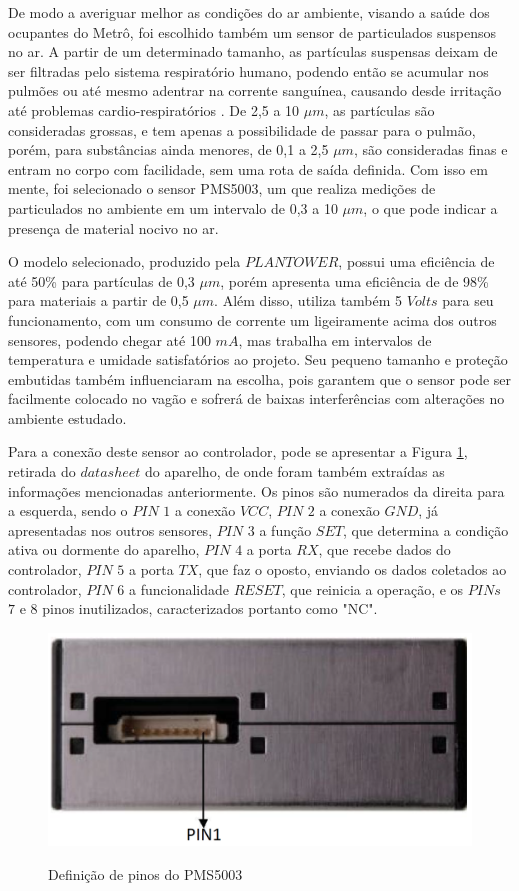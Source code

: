 \documentclass[acronym,symbols]{fei}
\begin{document}
De modo a averiguar melhor as condições do ar ambiente, visando a saúde dos ocupantes do Metrô, foi escolhido também um sensor de particulados suspensos no ar. A partir de um determinado tamanho, as partículas suspensas deixam de ser filtradas pelo sistema respiratório humano, podendo então se acumular nos pulmões ou até mesmo adentrar na corrente sanguínea, causando desde irritação até problemas cardio-respiratórios \cite{pm25}. De 2,5 a 10 $\mu$$m$, as partículas são consideradas grossas, e tem apenas a possibilidade de passar para o pulmão, porém, para substâncias ainda menores, de 0,1 a 2,5 $\mu$$m$, são consideradas finas e entram no corpo com facilidade, sem uma rota de saída definida. Com isso em mente, foi selecionado o sensor PMS5003, um que realiza medições de particulados no ambiente em um intervalo de 0,3 a 10 $\mu$$m$, o que pode indicar a presença de material nocivo no ar.

O modelo selecionado, produzido pela $PLANTOWER$, possui uma eficiência de até 50\% para partículas de 0,3 $\mu$$m$, porém apresenta uma eficiência de de 98\% para materiais a partir de 0,5 $\mu$$m$. Além disso, utiliza também 5 $Volts$ para seu funcionamento, com um consumo de corrente um ligeiramente acima dos outros sensores, podendo chegar até 100 $mA$, mas trabalha em intervalos de temperatura e umidade satisfatórios ao projeto. Seu pequeno tamanho e proteção embutidas também influenciaram na escolha, pois garantem que o sensor pode ser facilmente colocado no vagão e sofrerá de baixas interferências com alterações no ambiente estudado.

Para a conexão deste sensor ao controlador, pode se apresentar a Figura \ref{fig:PinPart}, retirada do $datasheet$ do aparelho, de onde foram também extraídas as informações mencionadas anteriormente. Os pinos são numerados da direita para a esquerda, sendo o $PIN$ $1$ a conexão $VCC$, $PIN$ $2$ a conexão $GND$, já apresentadas nos outros sensores, $PIN$ $3$ a função $SET$, que determina a condição ativa ou dormente do aparelho, $PIN$ $4$ a porta $RX$, que recebe dados do controlador, $PIN$ $5$ a porta $TX$, que faz o oposto, enviando os dados coletados ao controlador, $PIN$ $6$ a funcionalidade $RESET$, que reinicia a operação, e os $PINs$ $7$ e $8$ pinos inutilizados, caracterizados portanto como "NC". 

\begin{figure}[!htb]
\centering
    \caption{Definição de pinos do PMS5003}
    \includegraphics[width=0.6\linewidth]{Imagens/PinPart.png}
    \label{fig:PinPart}
\end{figure}
\end{document}
